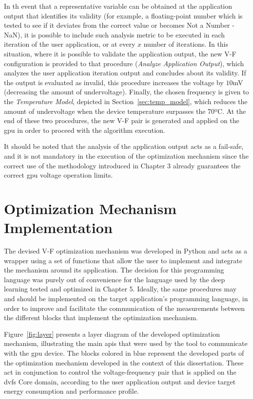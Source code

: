 In th event that a representative variable can be obtained at the application output that identifies its  validity (for example, a floating-point number which is tested to see if it deviates from the correct value or becomes Not a Number - NaN), it is possible to include such analysis metric to be executed in each iteration of the user application, or at every $x$ number of iterations.
In this situation, where it is possible to validate the application output, the new V-F configuration is provided to that procedure (\textit{Analyze Application Output}), which analyzes the user application iteration output and concludes about its validity. If the output is evaluated as invalid, this procedure increases the voltage by $10$mV (decreasing the amount of undervoltage). Finally, the chosen frequency is given to the \textit{Temperature Model}, depicted in Section~\ref{sec:temp_model}, which reduces the amount of undervoltage when the device temperature surpasses the 70ºC.  At the end of these two procedures, the new V-F pair is generated and applied on the \acrshort{gpu} in order to proceed with the algorithm execution.

It should be noted that the analysis of the application output acts as a fail-safe, and it is not mandatory in the execution of the optimization mechanism since the correct use of the methodology introduced in Chapter 3 already guarantees the correct \acrshort{gpu} voltage operation limits.




\section{Optimization Mechanism Implementation}
\label{sec:implementation}

The devised V-F optimization mechanism was developed in Python and acts as a wrapper using a set of  functions that allow the user to implement and integrate the mechanism around its application. The decision for this programming language was purely out of convenience for the language used by the deep learning tested and optimized in Chapter 5. Ideally, the same procedures may and should be implemented on the target application's programming language, in order to improve and facilitate the communication of the measurements between the different blocks that implement the optimization mechanism.

Figure~\ref{fig:layer} presents a layer diagram of the developed optimization mechanism, illustrating the main \acrshort{api}s that were used by the tool to communicate with the \acrshort{gpu} device. 
The blocks colored in blue represent the developed parts of the optimization mechanism developed in the context of this dissertation.
These act in conjunction to control the voltage-frequency pair that is applied on the \acrshort{dvfs} Core domain, according to the user application output and device target energy consumption and performance profile.

